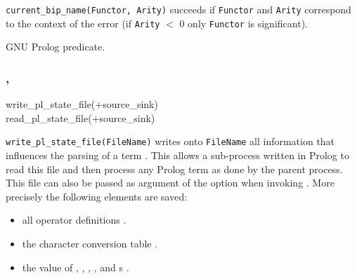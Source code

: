 \Description

\texttt{current\_bip\_name(Functor, Arity)} succeeds if \texttt{Functor} and
\texttt{Arity} correspond to the context of the error  (if \texttt{Arity} $<$ 0 only \texttt{Functor} is
significant).

\begin{PlErrors}



\end{PlErrors}

\Portability

GNU Prolog predicate.

\subsubsection{,\label{write-pl-state-file/1}
               }

\begin{TemplatesOneCol}
write\_pl\_state\_file(+source\_sink)\\
read\_pl\_state\_file(+source\_sink)

\end{TemplatesOneCol}

\Description

\texttt{write\_pl\_state\_file(FileName)} writes onto \texttt{FileName} all
information that influences the parsing of a term . This allows a sub-process written in Prolog to read this
file and then process any Prolog term as done by the parent process. This
file can also be passed as argument of the  option when
invoking  . More precisely the
following elements are saved:

\begin{itemize}

\item all operator definitions .

\item the character conversion table .

\item the value of , , , ,  and  s
.

\end{itemize}

